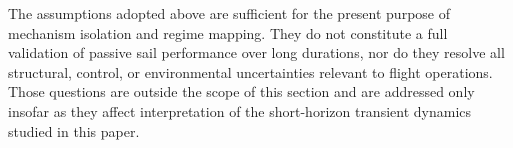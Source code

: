 \vspace{5pt}
\par\noindent The assumptions adopted above are sufficient for the present purpose of mechanism isolation and regime mapping. They do not constitute a full validation of passive sail performance over long durations, nor do they resolve all structural, control, or environmental uncertainties relevant to flight operations. Those questions are outside the scope of this section and are addressed only insofar as they affect interpretation of the short-horizon transient dynamics studied in this paper.
\FloatBarrier